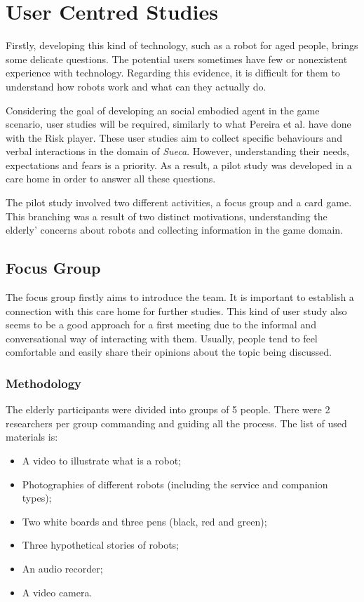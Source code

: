 \section{User Centred Studies} \label{sec:user-studies}

Firstly, developing this kind of technology, such as a robot for aged people, brings some delicate questions.
The potential users sometimes have few or nonexistent experience with technology.
Regarding this evidence, it is difficult for them to understand how robots work and what can they actually do.

Considering the goal of developing an social embodied agent in the game scenario, user studies will be required, similarly to what Pereira et al. have done with the Risk player.
These user studies aim to collect specific behaviours and verbal interactions in the domain of \emph{Sueca}.
However, understanding their needs, expectations and fears is a priority. As a result, a pilot study was developed in a care home in order to answer all these questions.

The pilot study involved two different
activities, a focus group and a card game.
This branching was a result of two distinct motivations, understanding the elderly' concerns about robots and collecting information in the game domain.





\subsection{Focus Group}
The focus group firstly aims to introduce the team.
It is important to establish a connection with this care home for further studies.
This kind of user study also seems to be a good approach for a first meeting due to the informal and conversational way of interacting with them.
Usually, people tend to feel comfortable and easily share their opinions about the topic being discussed.

\subsubsection{Methodology}
The elderly participants were divided into groups of 5 people.
There were 2 researchers per group commanding and guiding all the process.
The list of used materials is:

\begin{itemize}
\item A video to illustrate what is a robot;
\item Photographies of different robots (including the service and companion types);
\item Two white boards and three pens (black, red and green);
\item Three hypothetical stories of robots;
\item An audio recorder;
\item A video camera.
\end{itemize}

